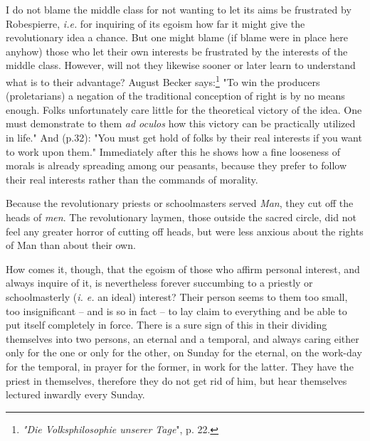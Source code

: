 \documentclass[a4paper]{book}
\begin{document}
I do not blame the middle class for not wanting to let its aims be frustrated 
by Robespierre, \textit{i.e.} for inquiring of its egoism how far it might 
give the revolutionary idea a chance. But one might blame (if blame were in 
place here anyhow) those who let their own interests be frustrated by the 
interests of the middle class. However, will not they likewise sooner or later 
learn to understand what is to their advantage? August Becker 
says:\footnote{\textit{"{}Die Volksphilosophie unserer Tage}"{}, p. 22.} "{}To 
win the producers (proletarians) a negation of the traditional conception of 
right is by no means enough. Folks unfortunately care little for the 
theoretical victory of the idea. One must demonstrate to them \textit{ad 
oculos} how this victory can be practically utilized in life."{} And (p.32): 
"{}You must get hold of folks by their real interests if you want to work upon 
them."{} Immediately after this he shows how a fine looseness of morals is 
already spreading among our peasants, because they prefer to follow their real 
interests rather than the commands of morality.

Because the revolutionary priests or schoolmasters served \textit{Man}, they 
cut off the heads of \textit{men}. The revolutionary laymen, those outside the 
sacred circle, did not feel any greater horror of cutting off heads, but were 
less anxious about the rights of Man than about their own.

How comes it, though, that the egoism of those who affirm personal interest, 
and always inquire of it, is nevertheless forever succumbing to a priestly or 
schoolmasterly (\textit{i. e.} an ideal) interest? Their person seems to them 
too small, too insignificant -- and is so in fact -- to lay claim to 
everything and be able to put itself completely in force. There is a sure sign 
of this in their dividing themselves into two persons, an eternal and a 
temporal, and always caring either only for the one or only for the other, on 
Sunday for the eternal, on the work-day for the temporal, in prayer for the 
former, in work for the latter. They have the priest in themselves, therefore 
they do not get rid of him, but hear themselves lectured inwardly every 
Sunday.
\end{document}
